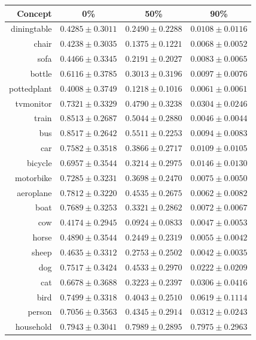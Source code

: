 \documentclass[11pt,a4paper]{book}
\begin{document}
\begin{table}[htbp]
\centering
\begin{tabular}{r|c|c|c}
Concept & 0\% & 50\% & 90\%\\\hline
diningtable   & $0.4285\pm0.3011$ & $0.2490\pm0.2288$ & $0.0108\pm0.0116$\\
chair         & $0.4238\pm0.3035$ & $0.1375\pm0.1221$ & $0.0068\pm0.0052$\\
sofa          & $0.4466\pm0.3345$ & $0.2191\pm0.2027$ & $0.0083\pm0.0065$\\
bottle        & $0.6116\pm0.3785$ & $0.3013\pm0.3196$ & $0.0097\pm0.0076$\\
pottedplant   & $0.4008\pm0.3749$ & $0.1218\pm0.1016$ & $0.0061\pm0.0061$\\
tvmonitor     & $0.7321\pm0.3329$ & $0.4790\pm0.3238$ & $0.0304\pm0.0246$\\
train         & $0.8513\pm0.2687$ & $0.5044\pm0.2880$ & $0.0046\pm0.0044$\\
bus           & $0.8517\pm0.2642$ & $0.5511\pm0.2253$ & $0.0094\pm0.0083$\\
car           & $0.7582\pm0.3518$ & $0.3866\pm0.2717$ & $0.0109\pm0.0105$\\
bicycle       & $0.6957\pm0.3544$ & $0.3214\pm0.2975$ & $0.0146\pm0.0130$\\
motorbike     & $0.7285\pm0.3231$ & $0.3698\pm0.2470$ & $0.0075\pm0.0050$\\
aeroplane     & $0.7812\pm0.3220$ & $0.4535\pm0.2675$ & $0.0062\pm0.0082$\\
boat          & $0.7689\pm0.3253$ & $0.3321\pm0.2862$ & $0.0072\pm0.0067$\\
cow           & $0.4174\pm0.2945$ & $0.0924\pm0.0833$ & $0.0047\pm0.0053$\\
horse         & $0.4890\pm0.3544$ & $0.2449\pm0.2319$ & $0.0055\pm0.0042$\\
sheep         & $0.4635\pm0.3312$ & $0.2753\pm0.2502$ & $0.0042\pm0.0035$\\
dog           & $0.7517\pm0.3424$ & $0.4533\pm0.2970$ & $0.0222\pm0.0209$\\
cat           & $0.6678\pm0.3688$ & $0.3223\pm0.2397$ & $0.0306\pm0.0416$\\
bird          & $0.7499\pm0.3318$ & $0.4043\pm0.2510$ & $0.0619\pm0.1114$\\
person        & $0.7056\pm0.3563$ & $0.4345\pm0.2914$ & $0.0312\pm0.0243$\\\hline
household     & $0.7943\pm0.3041$ & $0.7989\pm0.2895$ & $0.7975\pm0.2963$\\

\end{tabular}
\end{table}
\end{document}

